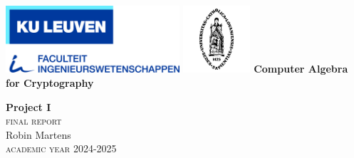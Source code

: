 \begin{titlepage}
    \newpage
    \thispagestyle{empty}
    \frenchspacing
    \hspace{-0.2cm}
    \hspace{0.2cm}
    \hspace{0.2cm}
    \includegraphics[height=2.5cm]{images/misc/logoFirW.jpg}
    \hspace{5.8cm}
    \includegraphics[height=2.5cm]{images/misc/kul_logo.jpg}
    \vfill
    \vspace{0.5cm}
    \centering\Large{\rm\textbf{{Computer Algebra for Cryptography}}}
    \vspace{5cm}
    \begin{center}
        \begin{minipage}[t]{\textwidth}
            \begin{center}
                \Huge{\rm\textbf{Project I}} \\
                \vspace{0.5cm}
                \large{\rm\textsc{{final report}}} \\
                \vspace{1cm}
                {\rm {Robin Martens}} \\
                \vspace{9cm}
                \LARGE{\rm\textsc{academic year 2024-2025}}
                \vfill
            \end{center}
        \end{minipage}
    \end{center}
    \vfill
\end{titlepage}
